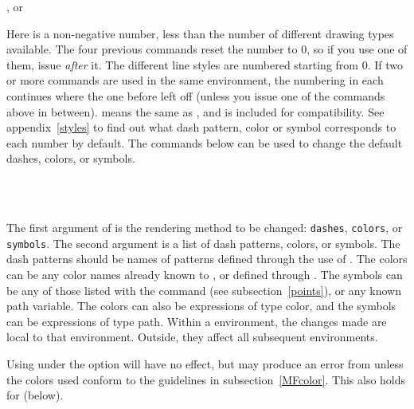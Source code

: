 \documentclass[letterpaper]{article}
\begin{document}
\begin{cd}
, or\\
%
%
\end{cd}

Here  is a non-negative number, less than the number of
different drawing types available. The four previous commands reset the
number to 0, so if you use one of them, issue 
\emph{after} it. The different line styles are numbered starting from
$0$. If two or more  commands are used in the same
 environment, the numbering in each continues where the one
before left off (unless you issue one of the commands above in between).
 means the same as , and is included
for compatibility. See appendix~\ref{styles} to find out what dash pattern,
color or symbol corresponds to each number by default. The commands
below can be used to change the default dashes,  colors, or symbols.

\begin{cd}
\\
\\
%
\end{cd}

The first argument of  is the rendering method to be
changed: \texttt{dashes}, \texttt{colors}, or \texttt{symbols}. The
second argument is a list of dash patterns, colors, or symbols. The dash
patterns should be names of patterns defined through the use of
. The colors can be any color names already known to
\MP{}, or defined through . The symbols can be any of
those listed with the  command (see
subsection~\ref{points}), or any known \MF{} path variable. The colors
can also be \MP{} expressions of type color, and the symbols can be
expressions of type path. Within a  environment, the changes
made are local to that environment. Outside, they affect all subsequent
environments.

Using  under the  option
will have no effect, but may produce an error from \MF{} unless the
colors used conform to the guidelines in subsection~\ref{MFcolor}.
This also holds for  (below).
\end{document}
